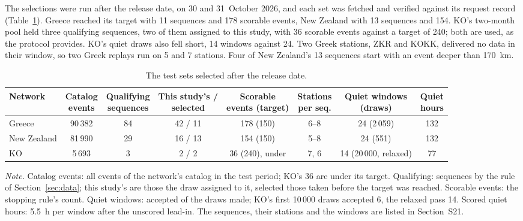 \documentclass[a4paper,fleqn]{cas-sc}
\newcommand{\tablenote}[1]{\par\vspace{4pt}%
  \begin{minipage}{\linewidth}\footnotesize\textit{Note.} #1
\end{minipage}}
\begin{document}
The selections were run after the release date, on 30 and 31~October 2026, and each
set was fetched and verified against its request record (Table~\ref{tab:selected}).
Greece reached its target with 11 sequences and 178 scorable events, New Zealand with
13 sequences and 154. KO's two-month pool held three qualifying sequences, two of them
assigned to this study, with 36 scorable events against a target of 240; both are
used, as the protocol provides. KO's quiet draws also fell short, 14 windows
against 24. Two Greek stations, ZKR and KOKK, delivered no data in their window, so two
Greek replays run on 5 and 7 stations. Four of New Zealand's 13 sequences start with
an event deeper than 170~km.

\begin{table}[pos=htbp]
  \centering\footnotesize
  \caption{The test sets selected after the release date.}\label{tab:selected}
  \setlength{\tabcolsep}{3pt}
  \begin{tabular}{@{}lccccccc@{}}
    \toprule
    Network & \makecell{Catalog\\events} & \makecell{Qualifying\\sequences} & \makecell{This study's /\\selected} & \makecell{Scorable\\events (target)} & \makecell{Stations\\per seq.} & \makecell{Quiet windows\\(draws)} & \makecell{Quiet\\hours} \\
    \midrule
    Greece & 90\,382 & 84 & 42 / 11 & 178 (150) & 6--8 & 24 (2\,059) & 132 \\
    New Zealand & 81\,990 & 29 & 16 / 13 & 154 (150) & 5--8 & 24 (551) & 132 \\
    KO & 5\,693 & 3 & 2 / 2 & 36 (240), under & 7, 6 & 14 (20\,000, relaxed) & 77 \\
    \bottomrule
  \end{tabular}
  \tablenote{Catalog events: all events of the network's catalog in the test period; KO's
    36 are under its target.
    Qualifying: sequences by the rule of Section~\ref{sec:data}; this study's are those
    the draw assigned to it, selected those taken before the target was reached. Scorable
    events: the stopping rule's count. Quiet windows: accepted of the draws made; KO's
    first 10\,000 draws accepted 6, the relaxed pass 14. Scored quiet hours: 5.5~h per
    window after the unscored lead-in. The sequences, their stations and the windows are
  listed in Section~S21.}
\end{table}
\end{document}
